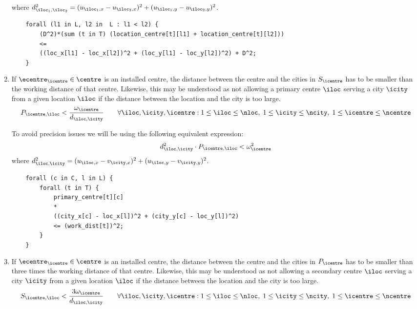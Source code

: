 \begin{enumerate}
    where $d_{\iloc_1, \iloc_2}^2 =
    (u_{\iloc_1, x} - u_{\iloc_2, x})^2 + (u_{\iloc_1, y} - u_{\iloc_2, y})^2$.
    
    \begin{lstlisting}
    forall (l1 in L, l2 in  L : l1 < l2) {
    	(D^2)*(sum (t in T) (location_centre[t][l1] + location_centre[t][l2]))
    	<=
    	((loc_x[l1] - loc_x[l2])^2 + (loc_y[l1] - loc_y[l2])^2) + D^2;
    }
    \end{lstlisting}

    \item If $\ecentre_\icentre \in \centre$ is an installed centre, the distance between the centre
    and the cities in $S_\icentre$ has to be smaller than the working distance of that centre. Likewise,
    this may be understood as not allowing a primary centre $\iloc$ serving a city $\icity$ from a given
    location $\iloc$ if the distance between the location and the city is too large.
    \begin{equation}
    P_{\icentre, \iloc} < \frac{\omega_{\icentre}}{d_{\iloc, \icity}}
    \qquad
    \forall \iloc, \icity, \icentre:
    1 \le \iloc \le \nloc,\;
    1 \le \icity \le \ncity,\;
    1 \le \icentre \le \ncentre
    \label{cstr:distance-centre-city-primary}
    \end{equation}
    
    To avoid precision issues we will be using the following equivalent expression:
    \[
    d_{\iloc, \icity}^2 \cdot P_{\icentre, \iloc} < \omega_{\icentre}^2
    \]
    where
    $d_{\iloc, \icity}^2 = (u_{\iloc, x} - v_{\icity, x})^2 + (u_{\iloc, y} - v_{\icity, y})^2$.

    \begin{lstlisting}
    forall (c in C, l in L) {
    	forall (t in T) {
    	    primary_centre[t][c]
    	    *
    		((city_x[c] - loc_x[l])^2 + (city_y[c] - loc_y[l])^2)
    		<= (work_dist[t])^2;
    	}
    }
    \end{lstlisting}

    \item If $\ecentre_\icentre \in \centre$ is an installed centre, the distance between the centre
    and the cities in $P_\icentre$ has to be smaller than three times the working distance of that
    centre. Likewise, this may be understood as not allowing a secondary centre $\iloc$ serving a
    city $\icity$ from a given location $\iloc$ if the distance between the location and the city
    is too large.
    \begin{equation}
    S_{\icentre, \iloc} < \frac{3\omega_{\icentre}}{d_{\iloc, \icity}}
    \qquad
    \forall \iloc, \icity, \icentre:
    1 \le \iloc \le \nloc,\;
    1 \le \icity \le \ncity,\;
    1 \le \icentre \le \ncentre
    \label{cstr:distance-centre-city-secondary}
    \end{equation}
    

\end{enumerate}
